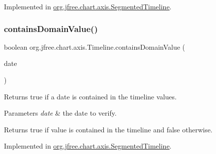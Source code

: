 Implemented in \mbox{\hyperlink{classorg_1_1jfree_1_1chart_1_1axis_1_1_segmented_timeline_aac440eed1b4484e0092a4bb041ef460c}{org.\+jfree.\+chart.\+axis.\+Segmented\+Timeline}}.

\mbox{\label{interfaceorg_1_1jfree_1_1chart_1_1axis_1_1_timeline_a256e6d8899290d1f8a31f9d0c5ec69e7}} 
\subsubsection{\texorpdfstring{contains\+Domain\+Value()}{containsDomainValue()}\hspace{0.1cm}{\footnotesize\ttfamily [2/2]}}
{\footnotesize\ttfamily boolean org.\+jfree.\+chart.\+axis.\+Timeline.\+contains\+Domain\+Value (\begin{DoxyParamCaption}\item[{Date}]{date }\end{DoxyParamCaption})}

Returns {\ttfamily true} if a date is contained in the timeline values.


\begin{DoxyParams}{Parameters}
{\em date} & the date to verify.\\
\hline
\end{DoxyParams}
\begin{DoxyReturn}{Returns}
{\ttfamily true} if value is contained in the timeline and {\ttfamily false} otherwise. 
\end{DoxyReturn}


Implemented in \mbox{\hyperlink{classorg_1_1jfree_1_1chart_1_1axis_1_1_segmented_timeline_a36df47cbf970d1268f96686da04bc199}{org.\+jfree.\+chart.\+axis.\+Segmented\+Timeline}}.

\mbox{\label{interfaceorg_1_1jfree_1_1chart_1_1axis_1_1_timeline_aa4bc34f354e4819d481369a12415a8c3}} 
